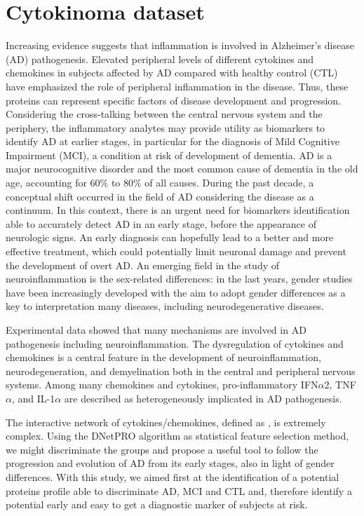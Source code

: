\documentclass{standalone}
\begin{document}
\section[Cytokinoma Dataset]{Cytokinoma dataset}\label{cytokine:cytokine}

Increasing evidence suggests that inflammation is involved in Alzheimer's disease (AD) pathogenesis.
Elevated peripheral levels of different cytokines and chemokines in subjects affected by AD compared with healthy control (CTL) have emphasized the role of peripheral inflammation in the disease.
Thus, these proteins can represent specific factors of disease development and progression.
Considering the cross-talking between the central nervous system and the periphery, the inflammatory analytes may provide utility as biomarkers to identify AD at earlier stages, in particular for the diagnosis of Mild Cognitive Impairment (MCI), a condition at risk of development of dementia.
AD is a major neurocognitive disorder and the most common cause of dementia in the old age, accounting for 60\% to 80\% of all causes.
During the past decade, a conceptual shift occurred in the field of AD considering the disease as a continuum.
In this context, there is an urgent need for biomarkers identification able to accurately detect AD in an early stage, before the appearance of neurologic signs.
An early diagnosis can hopefully lead to a better and more effective treatment, which could potentially limit neuronal damage and prevent the development of overt AD.
An emerging field in the study of neuroinflammation is the sex-related differences: in the last years, gender studies have been increasingly developed with the aim to adopt gender differences as a key to interpretation many diseases, including neurodegenerative diseases.

Experimental data showed that many mechanisms are involved in AD pathogenesis including neuroinflammation.
The dysregulation of cytokines and chemokines is a central feature in the development of neuroinflammation, neurodegeneration, and demyelination both in the central and peripheral nervous systems.
Among many chemokines and cytokines, pro-inflammatory IFN$\alpha$2, TNF$\alpha$, and IL-1$\alpha$ are described as heterogeneously implicated in AD pathogenesis.

The interactive network of cytokines/chemokines, defined as , is extremely complex.
Using the DNetPRO algorithm as statistical feature selection method, we might discriminate the groups and propose a useful tool to follow the progression and evolution of AD from its early stages, also in light of gender differences.
With this study, we aimed first at the identification of a potential proteins profile able to discriminate AD, MCI and CTL and, therefore identify a potential early and easy to get a diagnostic marker of subjects at risk.
\end{document}
